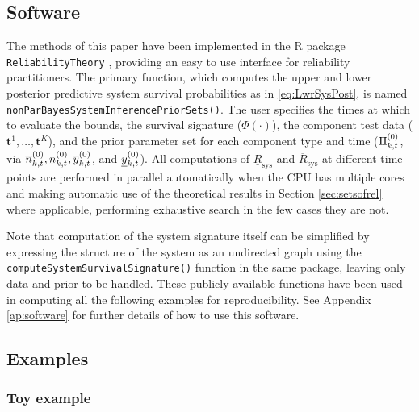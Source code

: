 \documentclass[12pt, a4paper]{elsarticle}
\newcommand{\bs}[1]{\boldsymbol{#1}}
\renewcommand{\vec}[1]{{\bs#1}}
\newcommand{\ul}[1]{\underline{#1}}
\newcommand{\ol}[1]{\overline{#1}}
\newcommand{\lRsys}{\ul{R}_\text{sys}}
\newcommand{\uRsys}{\ol{R}_\text{sys}}
\begin{document}
\subsection{Software}

The methods of this paper have been implemented in the \textsf{R}
\citep{R} package \texttt{ReliabilityTheory} \citep{2015:aslett-RT},
providing an easy to use interface for reliability practitioners.  The
primary function, which computes the upper and lower posterior
predictive system survival probabilities as in \eqref{eq:LwrSysPost}, is
named \texttt{nonParBayesSystemInferencePriorSets()}.  The user
specifies the times at which to evaluate the bounds, the survival
signature ($\Phi(\cdot)$), the component test data ($\vec{t}^1, \ldots,
\vec{t}^K$), and the prior parameter set for each component type and
time ($\Pi^{(0)}_{k,t}$, via $\nzu_{k,t}, \nzl_{k,t}, \yzu_{k,t}$, and
$\yzl_{k,t}$).  All computations of $\lRsys$
and $\uRsys$ at different time points are performed in parallel
automatically when the CPU has multiple cores and making automatic
use of the theoretical results in Section \ref{sec:setsofrel} where
applicable, performing exhaustive search in the few cases they are not.

Note that computation of the system signature itself can be simplified by
expressing the structure of the system as an undirected graph using the
\texttt{computeSystemSurvivalSignature()} function in the same package,
leaving only data and prior to be handled.  These publicly available
functions have been used in computing all the following examples for
reproducibility.  See Appendix \ref{ap:software} for further details of how to use this software.

\subsection{Examples}

\subsubsection{Toy example}
\end{document}
